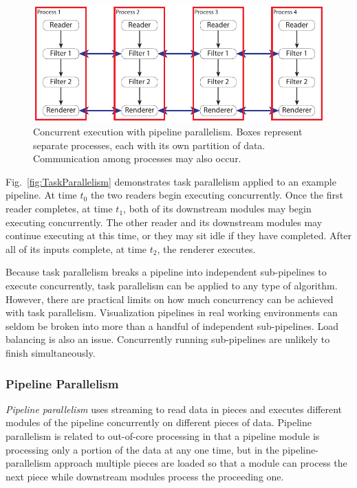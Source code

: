 \documentclass[journal,twocolumn,10pt,letterpaper,twoside]{IEEEtran}
\newcommand*{\figref}[1]{Fig.~\ref{#1}}
\newcommand*{\keyterm}[1]{\emph{#1}}
\begin{document}
\begin{figure}[htbp]
  \centering
  \includegraphics[scale=.9]{images/DataParallel}
  \caption{Concurrent execution with pipeline parallelism.  Boxes represent
    separate processes, each with its own partition of data.  Communication
    among processes may also occur.}
  \label{fig:DataParallelism}
\end{figure}

\figref{fig:TaskParallelism} demonstrates task parallelism applied to
an example pipeline.  At time $t_0$ the two readers begin executing
concurrently.  Once the first reader completes, at time $t_1$, both of its
downstream modules may begin executing concurrently.  The other reader
and its downstream modules may continue executing at this time, or they
may sit idle if they have completed.  After all of its inputs complete, at
time $t_2$, the renderer executes.

Because task parallelism breaks a pipeline into independent sub-pipelines
to execute concurrently, task parallelism can be applied to any type of
algorithm.  However, there are practical limits on how much concurrency
can be achieved with task parallelism.  Visualization pipelines in real
working environments can seldom be broken into more than a handful of
independent sub-pipelines.  Load balancing is also an issue.  Concurrently
running sub-pipelines are unlikely to finish simultaneously.

\subsubsection{Pipeline Parallelism}
\label{sec:PipelineParallelism}

\keyterm{Pipeline parallelism} uses streaming to read data in pieces and
executes different modules of the pipeline concurrently on different
pieces of data.  Pipeline parallelism is related to out-of-core processing
in that a pipeline module is processing only a portion of the data at
any one time, but in the pipeline-parallelism approach multiple pieces are
loaded so that a module can process the next piece while downstream
modules process the proceeding one.
\end{document}
